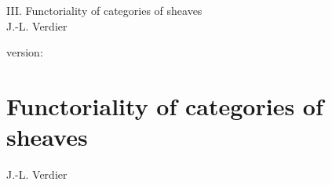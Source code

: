 \documentclass[10pt]{../fichiers-configuration-latex/smfart}
\begin{document}
\begin{center}
III. Functoriality of categories of sheaves\\
J.-L. Verdier
\end{center}

version: \showgitstatus
\tableofcontents

\else
\chapter{Functoriality of categories of sheaves}
\begin{center}
J.-L. Verdier
\end{center}
\fi
{}\label{sga4.exp.III}














\end{document}
